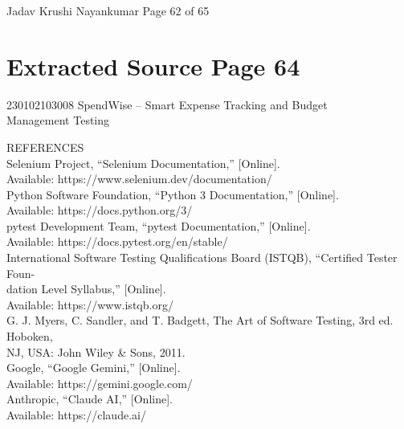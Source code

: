 \documentclass[12pt,a4paper]{report}
\begin{document}
\smallskip

\smallskip

\smallskip

\smallskip
Jadav Krushi Nayankumar                                                          Page 62 of 65\\ 

\clearpage
\section*{Extracted Source Page 64}
230102103008                        SpendWise – Smart Expense Tracking and Budget\\ 
Management Testing\\ 

\smallskip

\smallskip

\smallskip
REFERENCES\\ 

\smallskip
[1] Selenium Project, “Selenium Documentation,” [Online].\\ 
Available: https://www.selenium.dev/documentation/\\ 

\smallskip
[2] Python Software Foundation, “Python 3 Documentation,” [Online].\\ 
Available: https://docs.python.org/3/\\ 

\smallskip
[3] pytest Development Team, “pytest Documentation,” [Online].\\ 
Available: https://docs.pytest.org/en/stable/\\ 

\smallskip
[4] International Software Testing Qualifications Board (ISTQB), “Certified Tester Foun-\\ 
dation Level Syllabus,” [Online].\\ 
Available: https://www.istqb.org/\\ 

\smallskip
[5] G. J. Myers, C. Sandler, and T. Badgett, The Art of Software Testing, 3rd ed. Hoboken,\\ 
NJ, USA: John Wiley \& Sons, 2011.\\ 

\smallskip
[6] Google, “Google Gemini,” [Online].\\ 
Available: https://gemini.google.com/\\ 

\smallskip
[7] Anthropic, “Claude AI,” [Online].\\ 
Available: https://claude.ai/\\ 
\end{document}

